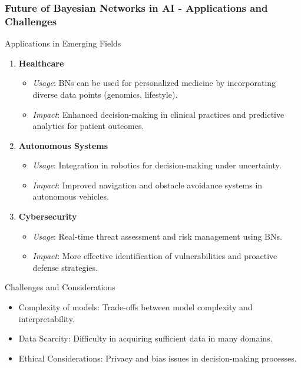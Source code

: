 \documentclass[aspectratio=169]{beamer}
\begin{document}
\begin{frame}[fragile]
    \frametitle{Future of Bayesian Networks in AI - Applications and Challenges}
    \begin{block}{Applications in Emerging Fields}
        \begin{enumerate}
            \item \textbf{Healthcare}
                \begin{itemize}
                    \item \textit{Usage}: BNs can be used for personalized medicine by incorporating diverse data points (genomics, lifestyle).
                    \item \textit{Impact}: Enhanced decision-making in clinical practices and predictive analytics for patient outcomes.
                \end{itemize}
            \item \textbf{Autonomous Systems}
                \begin{itemize}
                    \item \textit{Usage}: Integration in robotics for decision-making under uncertainty.
                    \item \textit{Impact}: Improved navigation and obstacle avoidance systems in autonomous vehicles.
                \end{itemize}
            \item \textbf{Cybersecurity}
                \begin{itemize}
                    \item \textit{Usage}: Real-time threat assessment and risk management using BNs.
                    \item \textit{Impact}: More effective identification of vulnerabilities and proactive defense strategies.
                \end{itemize}
        \end{enumerate}
    \end{block}
    
    \begin{block}{Challenges and Considerations}
        \begin{itemize}
            \item Complexity of models: Trade-offs between model complexity and interpretability.
            \item Data Scarcity: Difficulty in acquiring sufficient data in many domains.
            \item Ethical Considerations: Privacy and bias issues in decision-making processes.
        \end{itemize}
    \end{block}
\end{frame}
\end{document}
